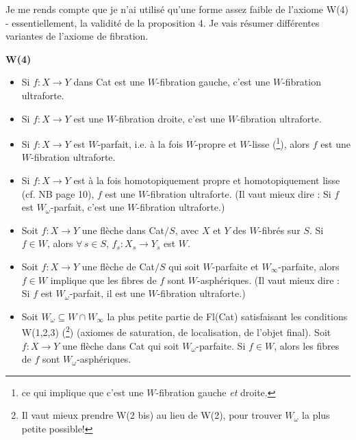 Je me rends compte que je n'ai utilisé qu'une forme assez faible de l'axiome W(4) - essentiellement, la validité de la proposition 4. Je vais résumer différentes variantes de l'axiome de fibration.

\textbf{W(4)}

\begin{itemize}[leftmargin=4em, labelwidth=2.5em, labelsep=0.6em, align=right]
\item[a$_1$)] Si $f : X \longrightarrow Y$ dans Cat est une $W$-fibration gauche, c'est une $W$-fibration ultraforte.

\item[a$_2$)] Si $f : X \longrightarrow Y$ est une $W$-fibration droite, c'est une $W$-fibration ultraforte.

\item[a$'$)] Si $f : X \longrightarrow Y$ est $W$-parfait, i.e. à la fois $W$-propre et $W$-lisse (\footnote[31]{ce qui implique que c'est une $W$-fibration gauche \textit{et} droite.}), alors $f$ est une $W$-fibration ultraforte.

\item[a$''$)] Si $f : X \longrightarrow Y$ est à la fois homotopiquement propre et homotopiquement lisse (cf. NB page 10), $f$ est une $W$-fibration ultraforte. (Il vaut mieux dire : Si $f$ est $W_\omega$-parfait, c'est une $W$-fibration ultraforte.)

\item[b)] Soit $f : X \longrightarrow Y$ une flèche dans Cat$/S$, avec $X$ et $Y$ des $W$-fibrés sur $S$. Si $f \in W$, alors $\forall\, s \in S$, $f_s : X_s \longrightarrow Y_s$ est $W$.

\item[b$'$)] Soit $f : X \longrightarrow Y$ une flèche de Cat$/S$ qui soit $W$-parfaite et $W_\infty$-parfaite, alors $f \in W$ implique que les fibres de $f$ sont $W$-asphériques. (Il vaut mieux dire : Si $f$ est $W_\omega$-parfait, il est une $W$-fibration ultraforte.)

\item[b$''$)] Soit $W_\omega \subseteq W \cap W_\infty$ la plus petite partie de Fl(Cat) satisfaisant les conditions W(1,2,3) (\footnote[32]{Il vaut mieux prendre W(2 bis) au lieu de W(2), pour trouver $W_\omega$ la plus petite possible!}) (axiomes de saturation, de localisation, de l'objet final). Soit $f : X \longrightarrow Y$ une flèche dans Cat qui soit $W_\omega$-parfaite. Si $f \in W$, alors les fibres de $f$ sont $W_\omega$-asphériques.
\end{itemize}

